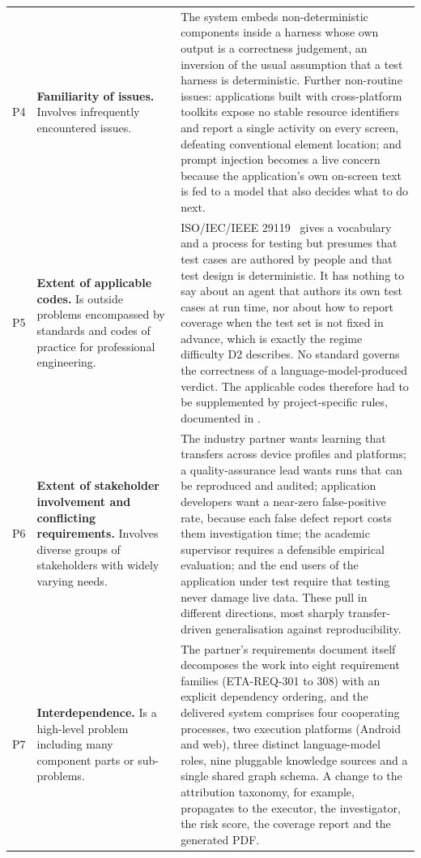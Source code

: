 \begin{xltabular}{\textwidth}{@{}l>{\hsize}Y>{\hsize}Y@{}}
  \addlinespace
  P4 & \textbf{Familiarity of issues.} Involves infrequently encountered issues. &
  The system embeds non-deterministic components inside a harness whose own output is a correctness judgement, an inversion of the usual assumption that a test harness is deterministic. Further non-routine issues: applications built with cross-platform toolkits expose no stable resource identifiers and report a single activity on every screen, defeating conventional element location; and prompt injection becomes a live concern because the application's own on-screen text is fed to a model that also decides what to do next. \\
  \addlinespace
  P5 & \textbf{Extent of applicable codes.} Is outside problems encompassed by standards and codes of practice for professional engineering. &
  ISO/IEC/IEEE 29119~\cite{iso29119} gives a vocabulary and a process for testing but presumes that test cases are authored by people and that test design is deterministic. It has nothing to say about an agent that authors its own test cases at run time, nor about how to report coverage when the test set is not fixed in advance, which is exactly the regime difficulty D2 describes. No standard governs the correctness of a language-model-produced verdict. The applicable codes therefore had to be supplemented by project-specific rules, documented in . \\
  \addlinespace
  P6 & \textbf{Extent of stakeholder involvement and conflicting requirements.} Involves diverse groups of stakeholders with widely varying needs. &
  The industry partner wants learning that transfers across device profiles and platforms; a quality-assurance lead wants runs that can be reproduced and audited; application developers want a near-zero false-positive rate, because each false defect report costs them investigation time; the academic supervisor requires a defensible empirical evaluation; and the end users of the application under test require that testing never damage live data. These pull in different directions, most sharply transfer-driven generalisation against reproducibility. \\
  \addlinespace
  P7 & \textbf{Interdependence.} Is a high-level problem including many component parts or sub-problems. &
  The partner's requirements document itself decomposes the work into eight requirement families (ETA-REQ-301 to 308) with an explicit dependency ordering, and the delivered system comprises four cooperating processes, two execution platforms (Android and web), three distinct language-model roles, nine pluggable knowledge sources and a single shared graph schema. A change to the attribution taxonomy, for example, propagates to the executor, the investigator, the risk score, the coverage report and the generated PDF. \\
\end{xltabular}
\endgroup

